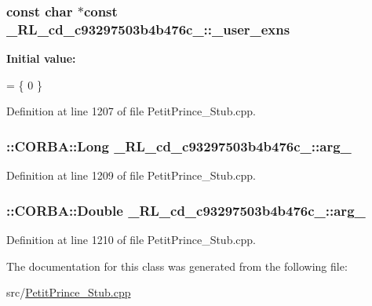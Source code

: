 \subsubsection[{\texorpdfstring{\+\_\+user\+\_\+exns}{_user_exns}}]{\setlength{\rightskip}{0pt plus 5cm}const char $\ast$const \+\_\+R\+L\+\_\+cd\+\_\+c93297503b4b476c\+\_\+::\+\_\+user\+\_\+exns\hspace{0.3cm}{\ttfamily [static]}}\hypertarget{class__0_r_l__cd__c93297503b4b476c__30000000_a49bdb6f8215069d7d5e9d5b93ab33cf5}{}\label{class__0_r_l__cd__c93297503b4b476c__30000000_a49bdb6f8215069d7d5e9d5b93ab33cf5}
{\bfseries Initial value\+:}
\begin{DoxyCode}
= \{
  0
\}
\end{DoxyCode}


Definition at line 1207 of file Petit\+Prince\+\_\+\+Stub.\+cpp.

\subsubsection[{\texorpdfstring{arg\+\_\+0}{arg_0}}]{\setlength{\rightskip}{0pt plus 5cm}\+::C\+O\+R\+B\+A\+::\+Long \+\_\+R\+L\+\_\+cd\+\_\+c93297503b4b476c\+\_\+::arg\+\_}\hypertarget{class__0_r_l__cd__c93297503b4b476c__30000000_a508ca8a434376dd8600660a60e41d84d}{}\label{class__0_r_l__cd__c93297503b4b476c__30000000_a508ca8a434376dd8600660a60e41d84d}


Definition at line 1209 of file Petit\+Prince\+\_\+\+Stub.\+cpp.

\subsubsection[{\texorpdfstring{arg\+\_\+1}{arg_1}}]{\setlength{\rightskip}{0pt plus 5cm}\+::C\+O\+R\+B\+A\+::\+Double \+\_\+R\+L\+\_\+cd\+\_\+c93297503b4b476c\+\_\+::arg\+\_}\hypertarget{class__0_r_l__cd__c93297503b4b476c__30000000_a84a569f3464f78e8a47f0c154dd7e164}{}\label{class__0_r_l__cd__c93297503b4b476c__30000000_a84a569f3464f78e8a47f0c154dd7e164}


Definition at line 1210 of file Petit\+Prince\+\_\+\+Stub.\+cpp.



The documentation for this class was generated from the following file\+:\begin{DoxyCompactItemize}
\item 
src/\hyperlink{_petit_prince___stub_8cpp}{Petit\+Prince\+\_\+\+Stub.\+cpp}\end{DoxyCompactItemize}

